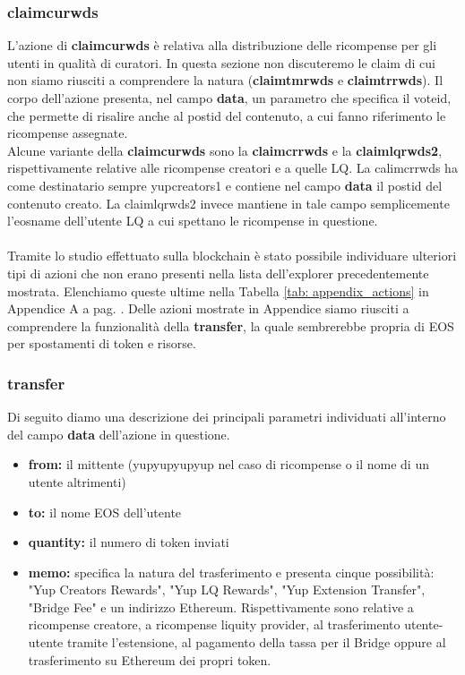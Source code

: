\subsubsection{claimcurwds}
L'azione di \textbf{claimcurwds} è relativa alla distribuzione delle ricompense per gli utenti in qualità di curatori. In questa sezione non discuteremo le claim di cui non siamo riusciti a comprendere la natura (\textbf{claimtmrwds} e \textbf{claimtrrwds}). Il corpo dell'azione presenta, nel campo \textbf{data}, un parametro che specifica il voteid, che permette di risalire anche al postid del contenuto, a cui fanno riferimento le ricompense assegnate. 
\\
Alcune variante della \textbf{claimcurwds} sono la \textbf{claimcrrwds} e la \textbf{claimlqrwds2}, rispettivamente relative alle ricompense creatori e a quelle LQ. La calimcrrwds ha come destinatario sempre yupcreators1 e contiene nel campo \textbf{data} il postid del contenuto creato. La claimlqrwds2 invece mantiene in tale campo semplicemente l'eosname dell'utente LQ a cui spettano le ricompense in questione.
\\
\\
Tramite lo studio effettuato sulla blockchain è stato possibile individuare ulteriori tipi di azioni che non erano presenti nella lista dell'explorer precedentemente mostrata. Elenchiamo queste ultime nella Tabella \ref{tab: appendix_actions} in Appendice A a pag. \pageref{appendix_marker}. Delle azioni mostrate in Appendice siamo riusciti a comprendere la funzionalità della \textbf{transfer}, la quale sembrerebbe propria di EOS per spostamenti di token e risorse.

\subsubsection{transfer}
Di seguito diamo una descrizione dei principali parametri individuati all'interno del campo \textbf{data} dell'azione in questione.

\begin{itemize}
    \item \textbf{from:} il mittente (yupyupyupyup nel caso di ricompense o il nome di un utente altrimenti)
    \item \textbf{to:} il nome EOS dell'utente
    \item \textbf{quantity:} il numero di token inviati
    \item \textbf{memo:} specifica la natura del trasferimento e presenta cinque possibilità: "Yup Creators Rewards", "Yup LQ Rewards", "Yup Extension Transfer", "Bridge Fee" e un indirizzo Ethereum. Rispettivamente sono relative a ricompense creatore, a ricompense liquity provider, al trasferimento utente-utente tramite l'estensione, al pagamento della tassa per il Bridge oppure al trasferimento su Ethereum dei propri token.
\end{itemize}

